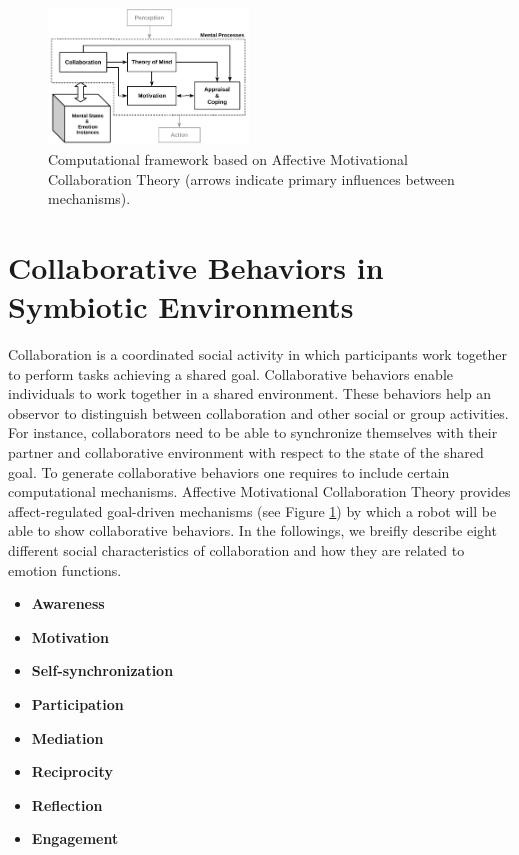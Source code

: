 \documentclass[letterpaper]{article}
\begin{document}
\begin{figure}[tbh]
  \centering
  \includegraphics[width=0.474\textwidth]{figure/theory-general-croped.pdf}
  \caption{Computational framework based on Affective Motivational Collaboration
  Theory (arrows indicate primary influences between mechanisms).}
  \label{fig:cpm}
\end{figure}

\section{Collaborative Behaviors in Symbiotic Environments}

Collaboration is a coordinated social activity in which participants work
together to perform tasks achieving a shared goal. Collaborative behaviors
enable individuals to work together in a shared environment. These behaviors
help an observor to distinguish between collaboration and other social or
group activities. For instance, collaborators need to be able to synchronize
themselves with their partner and collaborative environment with respect to the
state of the shared goal. To generate collaborative behaviors one requires to
include certain computational mechanisms. Affective Motivational Collaboration
Theory provides affect-regulated goal-driven mechanisms (see Figure
\ref{fig:cpm}) by which a robot will be able to show collaborative behaviors. In
the followings, we breifly describe eight different social characteristics of
collaboration and how they are related to emotion functions.

\begin{itemize}
  \item \textbf{Awareness}
  \item \textbf{Motivation}
  \item \textbf{Self-synchronization}
  \item \textbf{Participation}
  \item \textbf{Mediation}
  \item \textbf{Reciprocity}
  \item \textbf{Reflection}
  \item \textbf{Engagement}
\end{itemize}
\end{document}
